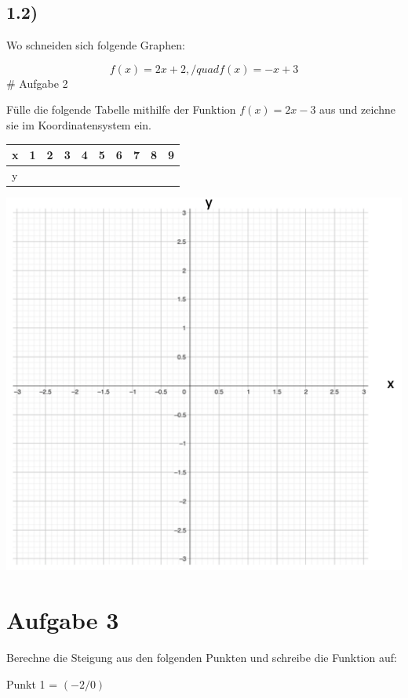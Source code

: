 \documentclass[
  letterpaper,
  DIV=11]{scrartcl}
\begin{document}
\subsection{1.2)}\label{section-1}

Wo schneiden sich folgende Graphen:

\[ f(x)=2x+2, /quad f(x)=-x+3\] \# Aufgabe 2

Fülle die folgende Tabelle mithilfe der Funktion \(f(x)=2x-3\) aus und
zeichne sie im Koordinatensystem ein.

\begin{longtable}[]{@{}llllllllll@{}}
\toprule\noalign{}
x & 1 & 2 & 3 & 4 & 5 & 6 & 7 & 8 & 9 \\
\midrule\noalign{}
\endhead
\bottomrule\noalign{}
\endlastfoot
y & & & & & & & & & \\
\end{longtable}

\includegraphics{images/Screenshot 2024-06-13 at 13.31.00.png}

\section{Aufgabe 3}\label{aufgabe-3}

Berechne die Steigung aus den folgenden Punkten und schreibe die
Funktion auf:

Punkt 1 = \((-2/0)\)
\end{document}
